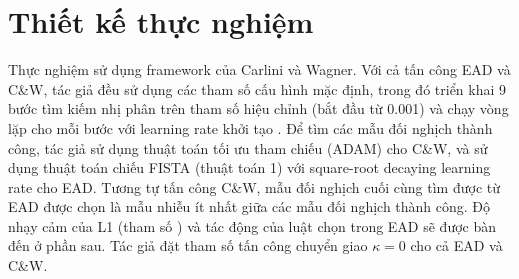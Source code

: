 \section{Thiết kế thực nghiệm}
Thực nghiệm sử dụng framework của Carlini và Wagner. Với cả tấn công EAD và C\&W, tác giả đều sử dụng các tham số cấu hình mặc định, trong đó triển khai 9 bước tìm kiếm nhị phân trên tham số hiệu chỉnh  (bắt đầu từ 0.001) và chạy  vòng lặp cho mỗi bước với learning rate khởi tạo . Để tìm các mẫu đối nghịch thành công, tác giả sử dụng thuật toán tối ưu tham chiếu (ADAM) cho C\&W, và sử dụng thuật toán chiếu FISTA (thuật toán 1) với square-root decaying learning rate cho EAD. Tương tự tấn công C\&W, mẫu đối nghịch cuối cùng tìm được từ EAD được chọn là mẫu nhiễu ít nhất giữa các mẫu đối nghịch thành công. Độ nhạy cảm của L1 (tham số  ) và tác động của luật chọn trong EAD sẽ được bàn đến ở phần sau. Tác giả đặt tham số tấn công chuyển giao $\kappa = 0$ cho cả EAD và C\&W.


